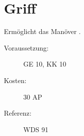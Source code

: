\section{Griff}
\label{sf.griff}
Ermöglicht das Manöver .
\begin{description}
    \item[Voraussetzung:]
        GE 10, KK 10
    \item [Kosten:]
        30 AP
    \item [Referenz:]
        WDS 91
\end{description}
